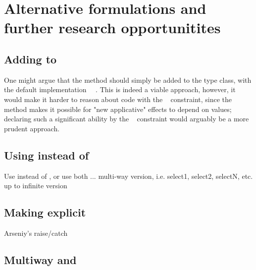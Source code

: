 \section{Alternative formulations and further research opportunitites}
\label{sec-alternatives}

\subsection{Adding  to }\label{sec-alt-applicative}

One might argue that the  method should simply be added to the
 type class, with the default implementation
~\hs{=}~. This is indeed a viable approach, however, it
would make it harder to reason about code with the ~
constraint, since the  method makes it possible for "new applicative"
effects to depend on values; declaring such a significant ability by the
~ constraint would arguably be a more prudent approach.

\subsection{Using  instead of }\label{sec-alt-branch}

Use  instead of , or use both
...
multi-way version, i.e. select1, select2, selectN, etc. up to infinite version

\subsection{Making  explicit}\label{sec-alt-either}

Arseniy's raise/catch

\subsection{Multiway  and }\label{sec-selectivedo}
